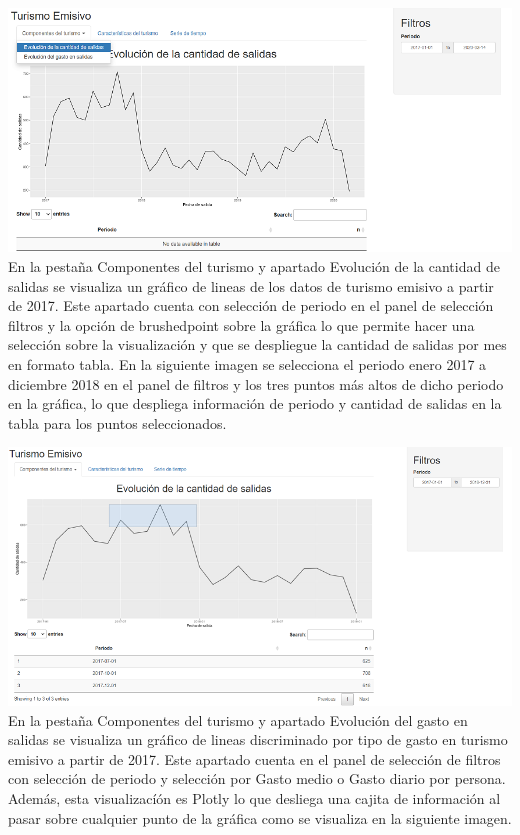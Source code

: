 \documentclass[
]{article}
\begin{document}
\includegraphics{Imagenes-shiny/imagen1.png} En la pestaña Componentes
del turismo y apartado Evolución de la cantidad de salidas se visualiza
un gráfico de lineas de los datos de turismo emisivo a partir de 2017.
Este apartado cuenta con selección de periodo en el panel de selección
filtros y la opción de brushedpoint sobre la gráfica lo que permite
hacer una selección sobre la visualización y que se despliegue la
cantidad de salidas por mes en formato tabla. En la siguiente imagen se
selecciona el periodo enero 2017 a diciembre 2018 en el panel de filtros
y los tres puntos más altos de dicho periodo en la gráfica, lo que
despliega información de periodo y cantidad de salidas en la tabla para
los puntos seleccionados.

\includegraphics{Imagenes-shiny/imagen2.png} En la pestaña Componentes
del turismo y apartado Evolución del gasto en salidas se visualiza un
gráfico de lineas discriminado por tipo de gasto en turismo emisivo a
partir de 2017. Este apartado cuenta en el panel de selección de filtros
con selección de periodo y selección por Gasto medio o Gasto diario por
persona. Además, esta visualizacíón es Plotly lo que desliega una cajita
de información al pasar sobre cualquier punto de la gráfica como se
visualiza en la siguiente imagen.
\end{document}
